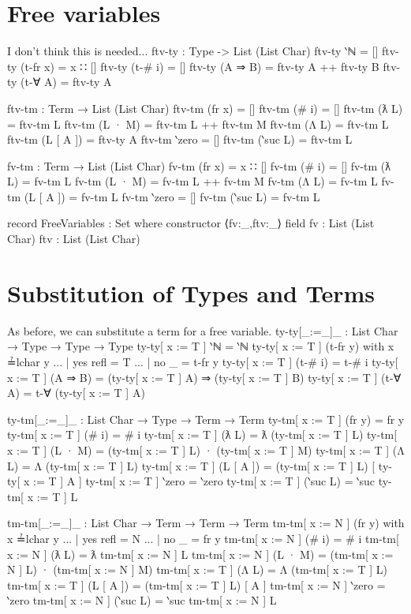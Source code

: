 \documentclass[logo,bsc,singlespacing,parskip,online]{infthesis}
\renewenvironment{code}{\mintedcopy[breaklines,breaksymbolleft=\;]{agda}}{\endmintedcopy}
\begin{document}
\section{Free variables}
I don't think this is needed...
\begin{code}
  ftv-ty : Type -> List (List Char)
  ftv-ty ‵ℕ = []
  ftv-ty (t-fr x) = x ∷ []
  ftv-ty (t-# i) = []
  ftv-ty (A ⇒ B) = ftv-ty A ++ ftv-ty B
  ftv-ty (t-∀ A) = ftv-ty A

  ftv-tm : Term → List (List Char)
  ftv-tm (fr x) = []
  ftv-tm (# i) = []
  ftv-tm (ƛ L) = ftv-tm L
  ftv-tm (L · M) = ftv-tm L ++ ftv-tm M
  ftv-tm (Λ L) = ftv-tm L
  ftv-tm (L [ A ]) = ftv-ty A
  ftv-tm ‵zero = []
  ftv-tm (‵suc L) = ftv-tm L

  fv-tm : Term → List (List Char)
  fv-tm (fr x) = x ∷ []
  fv-tm (# i) = []
  fv-tm (ƛ L) = fv-tm L
  fv-tm (L · M) = fv-tm L ++ fv-tm M
  fv-tm (Λ L) = fv-tm L
  fv-tm (L [ A ]) = fv-tm L
  fv-tm ‵zero = []
  fv-tm (‵suc L) = fv-tm L

  record FreeVariables : Set where
    constructor ⟨fv:_,ftv:_⟩
    field
      fv : List (List Char)
      ftv : List (List Char)
\end{code}

\section{Substitution of Types and Terms}
As before, we can substitute a term for a free variable.
\begin{code}
  ty-ty[_:=_]_ : List Char → Type → Type → Type
  ty-ty[ x := T ] ‵ℕ = ‵ℕ
  ty-ty[ x := T ] (t-fr y) with x ≟lchar y
  ... | yes refl = T
  ... | no  _    = t-fr y
  ty-ty[ x := T ] (t-# i) = t-# i
  ty-ty[ x := T ] (A ⇒ B) = (ty-ty[ x := T ] A) ⇒ (ty-ty[ x := T ] B)
  ty-ty[ x := T ] (t-∀ A) = t-∀ (ty-ty[ x := T ] A)

  ty-tm[_:=_]_ : List Char → Type → Term → Term
  ty-tm[ x := T ] (fr y) = fr y
  ty-tm[ x := T ] (# i) = # i
  ty-tm[ x := T ] (ƛ L) = ƛ (ty-tm[ x := T ] L) 
  ty-tm[ x := T ] (L · M) = (ty-tm[ x := T ] L) · (ty-tm[ x := T ] M)
  ty-tm[ x := T ] (Λ L) = Λ (ty-tm[ x := T ] L)
  ty-tm[ x := T ] (L [ A ]) = (ty-tm[ x := T ] L) [ ty-ty[ x := T ] A ]
  ty-tm[ x := T ] ‵zero = ‵zero
  ty-tm[ x := T ] (‵suc L) = ‵suc ty-tm[ x := T ] L

  tm-tm[_:=_]_ : List Char → Term → Term → Term
  tm-tm[ x := N ] (fr y) with x ≟lchar y
  ... | yes refl = N
  ... | no  _    = fr y
  tm-tm[ x := N ] (# i) = # i
  tm-tm[ x := N ] (ƛ L) = ƛ tm-tm[ x := N ] L
  tm-tm[ x := N ] (L · M) = (tm-tm[ x := N ] L) · (tm-tm[ x := N ] M)
  tm-tm[ x := T ] (Λ L) = Λ (tm-tm[ x := T ] L)
  tm-tm[ x := T ] (L [ A ]) = (tm-tm[ x := T ] L) [ A ]
  tm-tm[ x := N ] ‵zero = ‵zero
  tm-tm[ x := N ] (‵suc L) = ‵suc tm-tm[ x := N ] L
\end{code}
\end{document}
